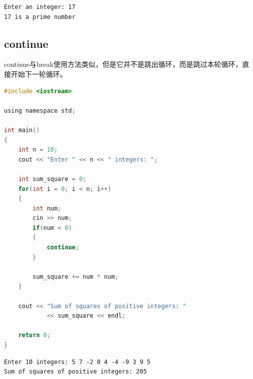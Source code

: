 \begin{tcolorbox}
    \begin{verbatim}
Enter an integer: 17
17 is a prime number
\end{verbatim}
\end{tcolorbox}

\vspace{0.5cm}

\subsection{continue}

continue与break使用方法类似，但是它并不是跳出循环，而是跳过本轮循环，直接开始下一轮循环。\\


\begin{lstlisting}[language=C]
#include <iostream>

using namespace std;

int main()
{
    int n = 10;
    cout << "Enter " << n << " integers: ";

    int sum_square = 0;
    for(int i = 0; i < n; i++)
    {
        int num;
        cin >> num;
        if(num < 0)
        {
            continue;
        }

        sum_square += num * num;
    }

    cout << "Sum of squares of positive integers: "
            << sum_square << endl;
            
    return 0;
}
\end{lstlisting}

\begin{tcolorbox}
    \begin{verbatim}
Enter 10 integers: 5 7 -2 0 4 -4 -9 3 9 5
Sum of squares of positive integers: 205
\end{verbatim}
\end{tcolorbox}

\newpage